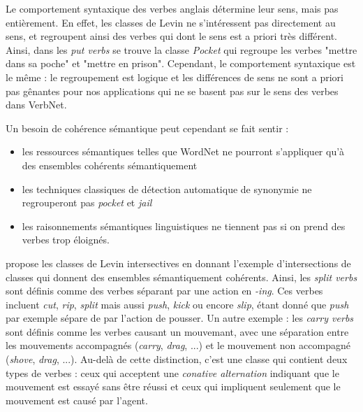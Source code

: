 

Le comportement syntaxique des verbes anglais détermine leur sens, mais pas
entièrement. En effet, les classes de Levin ne s'intéressent pas directement au
sens, et regroupent ainsi des verbes qui dont le sens est a priori très
différent. Ainsi, dans les \textit{put verbs} se trouve la classe
\textit{Pocket} qui regroupe les verbes "mettre dans sa poche" et "mettre en
prison". Cependant, le comportement syntaxique est le même : le regroupement
est logique et les différences de sens ne sont a priori pas gênantes pour nos
applications qui ne se basent pas sur le sens des verbes dans VerbNet.

Un besoin de cohérence sémantique peut cependant se fait sentir :

\begin{itemize}

    \item les ressources sémantiques telles que WordNet ne pourront s'appliquer
        qu'à des ensembles cohérents sémantiquement

    \item les techniques classiques de détection automatique de synonymie ne
        regrouperont pas \textit{pocket} et \textit{jail}

    \item les raisonnements sémantiques linguistiques ne tiennent pas si on
        prend des verbes trop éloignés.

\end{itemize}

\cite{dang1998investigating} propose les classes de Levin intersectives en
donnant l'exemple d'intersections de classes qui donnent des ensembles
sémantiquement cohérents. Ainsi, les \textit{split verbs} sont définis comme
des verbes séparant par une action en \textit{-ing}. Ces verbes incluent
\textit{cut}, \textit{rip}, \textit{split} mais aussi \textit{push},
\textit{kick} ou encore \textit{slip}, étant donné que \textit{push} par
exemple sépare de par l'action de pousser. Un autre exemple : les \textit{carry
verbs} sont définis comme les verbes causant un mouvemant, avec une séparation
entre les mouvements accompagnés (\textit{carry}, \textit{drag}, ...) et le
mouvement non accompagné (\textit{shove}, \textit{drag}, ...). Au-delà de cette
distinction, c'est une classe qui contient deux types de verbes : ceux qui
acceptent une \textit{conative alternation} indiquant que le mouvement est
essayé sans être réussi et ceux qui impliquent seulement que le mouvement est
causé par l'agent.

